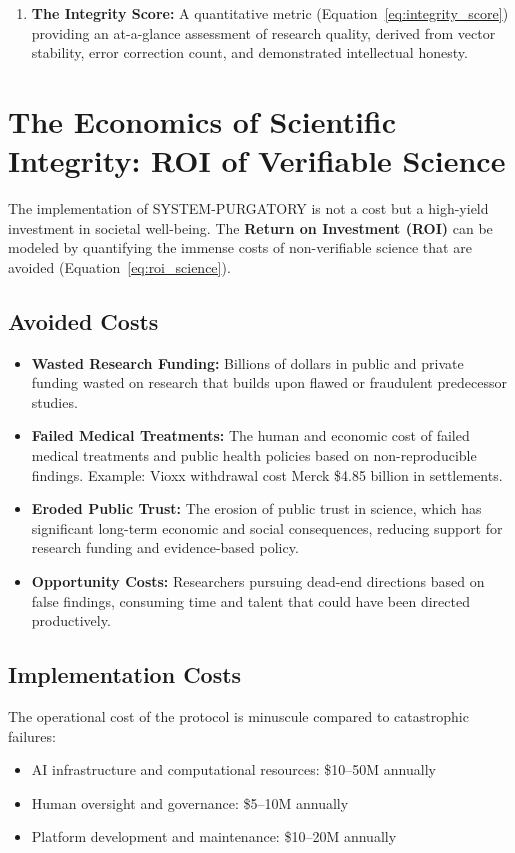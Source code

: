 \documentclass[11pt,a4paper]{article}
\begin{document}
\begin{small}
\begin{enumerate}
    \item \textbf{The Integrity Score:} A quantitative metric (Equation~\eqref{eq:integrity_score}) providing an at-a-glance assessment of research quality, derived from vector stability, error correction count, and demonstrated intellectual honesty.
\end{enumerate}

\section{The Economics of Scientific Integrity: ROI of Verifiable Science}
The implementation of SYSTEM-PURGATORY is not a cost but a high-yield investment in societal well-being. The \textbf{Return on Investment (ROI)} can be modeled by quantifying the immense costs of non-verifiable science that are avoided (Equation~\eqref{eq:roi_science}).

\subsection{Avoided Costs}
\begin{itemize}[nosep]
    \item \textbf{Wasted Research Funding:} Billions of dollars in public and private funding wasted on research that builds upon flawed or fraudulent predecessor studies.
    
    \item \textbf{Failed Medical Treatments:} The human and economic cost of failed medical treatments and public health policies based on non-reproducible findings. Example: Vioxx withdrawal cost Merck \$4.85 billion in settlements.
    
    \item \textbf{Eroded Public Trust:} The erosion of public trust in science, which has significant long-term economic and social consequences, reducing support for research funding and evidence-based policy.
    
    \item \textbf{Opportunity Costs:} Researchers pursuing dead-end directions based on false findings, consuming time and talent that could have been directed productively.
\end{itemize}

\subsection{Implementation Costs}
The operational cost of the protocol is minuscule compared to catastrophic failures:
\begin{itemize}[nosep]
    \item AI infrastructure and computational resources: \$10--50M annually
    \item Human oversight and governance: \$5--10M annually
    \item Platform development and maintenance: \$10--20M annually
\end{itemize}


\end{small}
\end{document}
